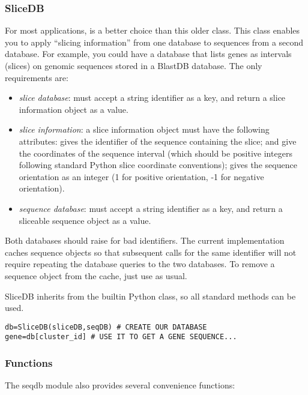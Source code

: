 \documentclass{howto}
\begin{document}
\subsubsection{SliceDB}
For most applications,  is a better choice than
this older class.
This class enables you to apply ``slicing information'' from 
one database to sequences from a second database.  For example,
you could have a database that lists genes as intervals (slices)
on genomic sequences stored in a BlastDB database.  The only
requirements are:
\begin{itemize}
\item
{\em slice database}: must accept a string identifier as a key,
and return a slice information object as a value.

\item
{\em slice information}: a slice information object must
have the following attributes:  gives the identifier
of the sequence containing the slice;  and 
give the coordinates of the sequence interval (which should be positive
integers following standard
Python slice coordinate conventions);  gives the sequence
orientation as an integer (1 for positive orientation, -1 for
negative orientation).

\item
{\em sequence database}: must accept a string identifier as a key,
and return a sliceable sequence object as a value.

\end{itemize}

Both databases should raise  for bad identifiers.
The current  implementation caches sequence objects so
that subsequent calls for the same identifier will not require
repeating the database queries to the two databases.  To
remove a sequence object from the cache, just use
 as usual.

SliceDB inherits from the builtin Python  class,
so all standard methods can be used.

\begin{verbatim}
db=SliceDB(sliceDB,seqDB) # CREATE OUR DATABASE
gene=db[cluster_id] # USE IT TO GET A GENE SEQUENCE...
\end{verbatim}



\subsubsection{Functions}
The seqdb module also provides several convenience functions:
\end{document}
